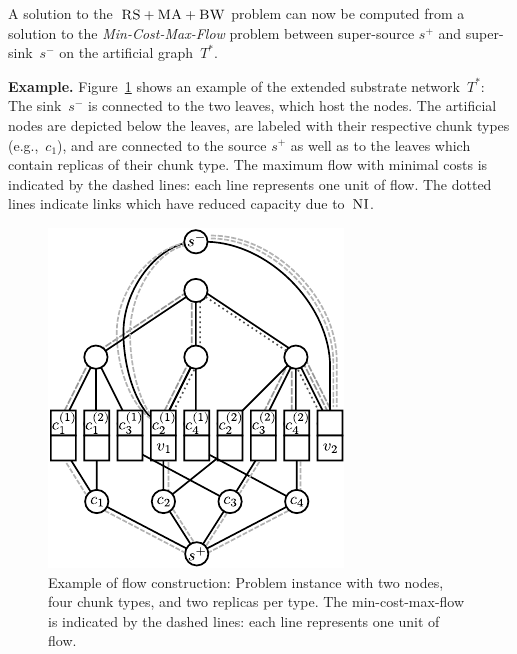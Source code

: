\documentclass[preprint,12pt]{elsarticle}
\newcommand{\Source}{\ensuremath{s^{+}}}
\newcommand{\Sink}{\ensuremath{s^{-}}}
\newcommand{\achunk}{\ensuremath{c}}
\newcommand{\CC}{\textsc{NI}}
\newcommand{\FP}{\textsc{FP}}
\newcommand{\RS}{\textsc{RS}}
\newcommand{\BW}{\textsc{BW}}
\newcommand{\MA}{\textsc{MA}}
\newcommand{\Tree}{\ensuremath{T}}
\begin{document}
A solution to the~$\RS+\MA+\BW$ problem can now be computed
from a solution to the \emph{Min-Cost-Max-Flow} problem between super-source
$\Source$ and
super-sink~$\Sink$ on the artificial graph~$\Tree^*$.

\textbf{Example.} Figure~\ref{fig:flow_construction} shows an example of the extended substrate
network~$\Tree^*$: The sink~$\Sink$ is connected to the two leaves, which host the
nodes. The artificial nodes are depicted below the leaves, are labeled with
their respective chunk types (e.g.,~$\achunk_1$), and are connected to the source
$\Source$ as well as to the leaves which contain replicas of their chunk type.
The
maximum flow with minimal costs is indicated by the dashed lines: each line
represents one unit of flow. The dotted lines indicate links which have reduced
capacity due to~$\CC$.

\begin{figure}
\centering
\includegraphics[width=0.45\columnwidth]{figs/flow_ma_cv}
\caption{Example of flow construction: Problem instance with two nodes, four chunk
types, and two replicas per type. The min-cost-max-flow
is indicated by the dashed lines: each line represents one unit of flow.
}
\vspace{-1em}
\label{fig:flow_construction}
\end{figure}
\end{document}
